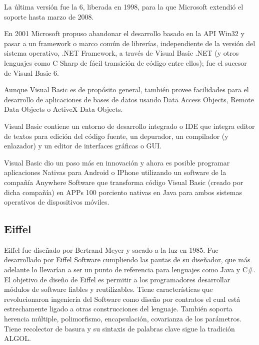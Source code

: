 \documentclass[twoside,twocolumn]{article}
\begin{document}
La última versión fue la 6, liberada en 1998, para la que Microsoft extendió el soporte hasta marzo de 2008.

En 2001 Microsoft propuso abandonar el desarrollo basado en la API Win32 y pasar a un framework o marco común de librerías, independiente de la versión del sistema operativo, .NET Framework, a través de Visual Basic .NET (y otros lenguajes como C Sharp de fácil transición de código entre ellos); fue el sucesor de Visual Basic 6.

Aunque Visual Basic es de propósito general, también provee facilidades para el desarrollo de aplicaciones de bases de datos usando Data Access Objects, Remote Data Objects o ActiveX Data Objects.

Visual Basic contiene un entorno de desarrollo integrado o IDE que integra editor de textos para edición del código fuente, un depurador, un compilador (y enlazador) y un editor de interfaces gráficas o GUI.

Visual Basic dio un paso más en innovación y ahora es posible programar aplicaciones Nativas para Android o IPhone utilizando un software de la compañía Anywhere Software que transforma código Visual Basic (creado por dicha compañía) en APPs 100 porciento nativas en Java para ambos sistemas operativos de dispositivos móviles.

\subsection{Eiffel}

Eiffel fue diseñado por Bertrand Meyer y sacado a la luz en 1985. Fue desarrollado por Eiffel Software cumpliendo las pautas de su diseñador, que más adelante lo llevarían a ser un punto de referencia para lenguajes como Java y C\#. El objetivo de diseño de Eiffel es permitir a los programadores desarrollar módulos de software fiables y reutilizables. Tiene características que revolucionaron ingeniería del Software como diseño por contratos el cual está estrechamente ligado a otras construcciones del lenguaje. También soporta herencia múltiple, polimorfismo, encapsulación, covarianza de los parámetros. Tiene recolector de basura y su sintaxis de palabras clave sigue la tradición ALGOL.
\end{document}
